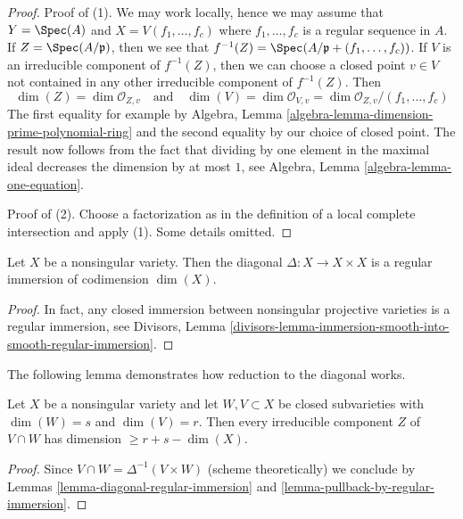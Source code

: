 \begin{proof}
Proof of (1). We may work locally, hence we may assume that
$Y = \Spec(A)$ and $X = V(f_1, \ldots, f_c)$ where $f_1, \ldots, f_c$
is a regular sequence in $A$. If $Z = \Spec(A/\mathfrak p)$, then
we see that $f^{-1}(Z) = \Spec(A/\mathfrak p + (f_1, \ldots, f_c))$.
If $V$ is an irreducible component of $f^{-1}(Z)$, then we can
choose a closed point $v \in V$ not contained in any other irreducible
component of $f^{-1}(Z)$. Then
$$
\dim(Z) = \dim \mathcal{O}_{Z, v}
\quad\text{and}\quad
\dim(V) = \dim \mathcal{O}_{V, v} = \dim \mathcal{O}_{Z, v}/(f_1, \ldots, f_c)
$$
The first equality for example by
Algebra, Lemma \ref{algebra-lemma-dimension-prime-polynomial-ring}
and the second equality by our choice of closed point.
The result now follows from the fact that dividing by one element
in the maximal ideal decreases the dimension by at most $1$, see
Algebra, Lemma \ref{algebra-lemma-one-equation}.

\medskip\noindent
Proof of (2). Choose a factorization as in the definition of a
local complete intersection and apply (1). Some details omitted.
\end{proof}

\begin{lemma}
\label{lemma-diagonal-regular-immersion}
Let $X$ be a nonsingular variety. Then the diagonal
$\Delta : X \to X \times X$ is a regular immersion of codimension $\dim(X)$.
\end{lemma}

\begin{proof}
In fact, any closed immersion between nonsingular projective
varieties is a regular immersion, see Divisors,
Lemma \ref{divisors-lemma-immersion-smooth-into-smooth-regular-immersion}.
\end{proof}

\noindent
The following lemma demonstrates how reduction to the diagonal works.

\begin{lemma}
\label{lemma-intersect-in-smooth}
Let $X$ be a nonsingular variety and let $W,V \subset X$
be closed subvarieties with $\dim(W) = s$ and $\dim(V) = r$. Then every
irreducible component $Z$ of $V \cap W$ has dimension $\geq r + s - \dim(X)$.
\end{lemma}

\begin{proof}
Since $V \cap W = \Delta^{-1}(V \times W)$ (scheme theoretically)
we conclude by Lemmas \ref{lemma-diagonal-regular-immersion} and
\ref{lemma-pullback-by-regular-immersion}.
\end{proof}

